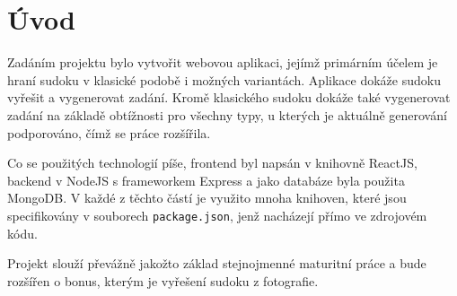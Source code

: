 \chapter*{Úvod}

Zadáním projektu bylo vytvořit webovou aplikaci, jejímž primárním účelem je hraní sudoku v klasické podobě i možných variantách. Aplikace dokáže sudoku vyřešit a vygenerovat zadání. Kromě klasického sudoku dokáže také vygenerovat zadání na základě obtížnosti pro všechny typy, u kterých je aktuálně generování podporováno, čímž se práce rozšířila. 

Co se použitých technologií píše, frontend byl napsán v knihovně ReactJS, backend v NodeJS s frameworkem Express a jako databáze byla použita MongoDB. V každé z těchto částí je využito mnoha knihoven, které jsou specifikovány v souborech \texttt{package.json}, jenž nacházejí přímo ve zdrojovém kódu.

Projekt slouží převážně jakožto základ stejnojmenné maturitní práce a bude rozšířen o bonus, kterým je vyřešení sudoku z fotografie.